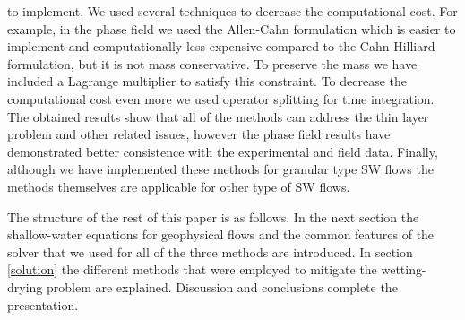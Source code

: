 \documentclass[letterpaper,10pt]{article}
\begin{document}
to implement. We used several techniques to decrease the computational cost. For example, in the phase field we used the Allen-Cahn formulation which is easier to implement and computationally less 
expensive compared to the Cahn-Hilliard formulation, but it is not mass conservative. To preserve the mass we have included a Lagrange multiplier \cite{Kim2014,Yang2006} to satisfy this constraint. 
To decrease the computational cost even more we used operator splitting for time integration. The obtained results show that all of the methods can address the thin layer problem and other 
related issues, however the phase field results have demonstrated better consistence with the experimental and field data. 
Finally, although we have implemented these methods for granular type SW flows the methods themselves are applicable for other type of SW flows.  

The structure of the rest of this paper is as follows. In the next section the shallow-water equations for geophysical flows and 
the common features of the solver that we used for all of the three methods are 
introduced. In section \ref{solution} the different methods that were employed to mitigate the wetting-drying problem are explained. 
Discussion and conclusions complete the presentation.
\end{document}
